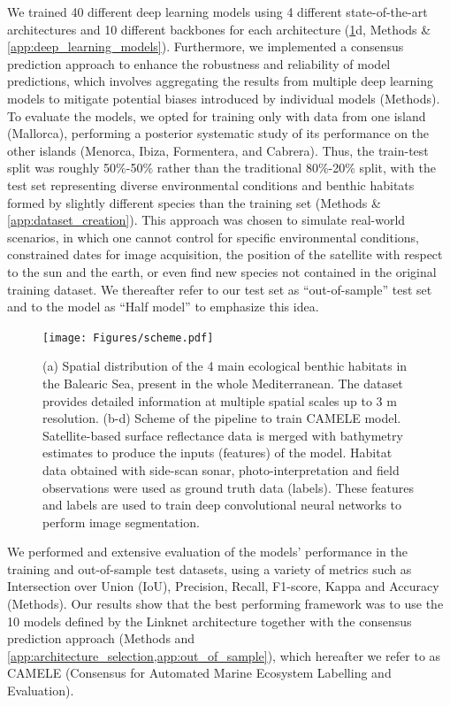 We trained 40 different deep learning models using 4
different state-of-the-art architectures and 10 different backbones for each
architecture (\cref{fig:scheme}d, Methods \& \cref{app:deep_learning_models}).
Furthermore, we implemented a consensus prediction approach to enhance the
robustness and reliability of model predictions, which involves aggregating the
results from multiple deep learning models to mitigate potential biases
introduced by individual models (Methods). To evaluate the models, we opted for
training only with data from
one island (Mallorca), performing a posterior systematic study of its
performance on the other islands (Menorca, Ibiza, Formentera, and Cabrera).
Thus, the train-test split was roughly 50\%-50\% rather than the traditional
80\%-20\% split, with the test set representing diverse environmental
conditions and benthic habitats formed by slightly different species than
the training set (Methods \& \cref{app:dataset_creation}). This approach
was
chosen to simulate real-world scenarios, in which one cannot control for
specific environmental conditions, constrained dates for image acquisition, the
position of the satellite with respect to the sun and the earth, or even find
new species not contained in the original training dataset. We thereafter refer
to our test set as ``out-of-sample'' test set and to the model as ``Half
model'' to emphasize this idea.

\begin{figure}[H]
    \centering
    \texttt{[image: Figures/scheme.pdf]}
    \caption[AI framework for seagrass monitoring from satellite imagery]{(a)
        Spatial distribution of the
        4 main ecological
        benthic habitats
        in the Balearic Sea, present in the whole Mediterranean. The dataset
        provides
        detailed information at multiple spatial scales up to 3 m resolution.
        (b-d)
        Scheme of the pipeline to train CAMELE model. Satellite-based
        surface
        reflectance data is merged with bathymetry estimates to produce the
        inputs
        (features) of the model. Habitat data obtained with side-scan sonar,
        photo-interpretation and field observations were used as ground truth
        data
        (labels). These features and labels are used to train deep
        convolutional
        neural networks to perform image segmentation.}
    \label{fig:scheme}
\end{figure}

We performed and extensive evaluation of the models' performance in the
training and out-of-sample test datasets, using a variety of metrics such as
Intersection over Union (IoU), Precision, Recall, F1-score, Kappa and Accuracy
(Methods). Our results show that the best performing framework was to use the
10 models defined by the Linknet architecture together with the consensus
prediction approach (Methods and
\cref{app:architecture_selection,app:out_of_sample}), which
hereafter we
refer to as CAMELE (Consensus for Automated Marine Ecosystem Labelling and
Evaluation).

